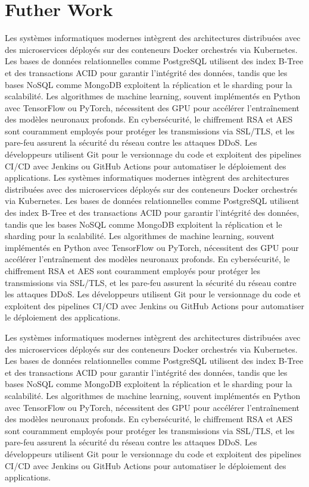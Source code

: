 \section{Futher Work}
Les systèmes informatiques modernes intègrent des architectures distribuées avec des microservices déployés sur des conteneurs Docker orchestrés via Kubernetes. Les bases de données relationnelles comme PostgreSQL utilisent des index B-Tree et des transactions ACID pour garantir l'intégrité des données, tandis que les bases NoSQL comme MongoDB exploitent la réplication et le sharding pour la scalabilité. Les algorithmes de machine learning, souvent implémentés en Python avec TensorFlow ou PyTorch, nécessitent des GPU pour accélérer l'entraînement des modèles neuronaux profonds. En cybersécurité, le chiffrement RSA et AES sont couramment employés pour protéger les transmissions via SSL/TLS, et les pare-feu assurent la sécurité du réseau contre les attaques DDoS. Les développeurs utilisent Git pour le versionnage du code et exploitent des pipelines CI/CD avec Jenkins ou GitHub Actions pour automatiser le déploiement des applications.
Les systèmes informatiques modernes intègrent des architectures distribuées avec des microservices déployés sur des conteneurs Docker orchestrés via Kubernetes. Les bases de données relationnelles comme PostgreSQL utilisent des index B-Tree et des transactions ACID pour garantir l'intégrité des données, tandis que les bases NoSQL comme MongoDB exploitent la réplication et le sharding pour la scalabilité. Les algorithmes de machine learning, souvent implémentés en Python avec TensorFlow ou PyTorch, nécessitent des GPU pour accélérer l'entraînement des modèles neuronaux profonds. En cybersécurité, le chiffrement RSA et AES sont couramment employés pour protéger les transmissions via SSL/TLS, et les pare-feu assurent la sécurité du réseau contre les attaques DDoS. Les développeurs utilisent Git pour le versionnage du code et exploitent des pipelines CI/CD avec Jenkins ou GitHub Actions pour automatiser le déploiement des applications.

Les systèmes informatiques modernes intègrent des architectures distribuées avec des microservices déployés sur des conteneurs Docker orchestrés via Kubernetes. Les bases de données relationnelles comme PostgreSQL utilisent des index B-Tree et des transactions ACID pour garantir l'intégrité des données, tandis que les bases NoSQL comme MongoDB exploitent la réplication et le sharding pour la scalabilité. Les algorithmes de machine learning, souvent implémentés en Python avec TensorFlow ou PyTorch, nécessitent des GPU pour accélérer l'entraînement des modèles neuronaux profonds. En cybersécurité, le chiffrement RSA et AES sont couramment employés pour protéger les transmissions via SSL/TLS, et les pare-feu assurent la sécurité du réseau contre les attaques DDoS. Les développeurs utilisent Git pour le versionnage du code et exploitent des pipelines CI/CD avec Jenkins ou GitHub Actions pour automatiser le déploiement des applications.

